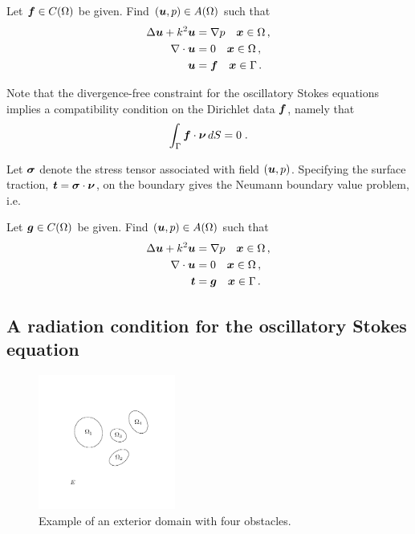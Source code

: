 \begin{definition}
  Let ${\boldsymbol f} \in C(\Omega)$ be given. Find $({\boldsymbol u},p) \in A(\Omega)$
  such that
  \begin{equation}
  \begin{aligned} \label{eq:dir_interior}
    \Delta {\boldsymbol u} + k^{2} {\boldsymbol u} &= \nabla p \quad {\boldsymbol x} \in \Omega \, ,\\
    \nabla \cdot {\boldsymbol u} &= 0 \quad {\boldsymbol x} \in \Omega \, ,  \\
    {\boldsymbol u} &= {\boldsymbol f} \quad {\boldsymbol x} \in \Gamma \, .
  \end{aligned}
  \end{equation}
\end{definition}
Note that the divergence-free constraint for the oscillatory
Stokes equations implies a compatibility condition on the
Dirichlet data ${\boldsymbol f}$, namely that
\begin{equation} \label{eq:dir_compat}
  \int_\Gamma {\boldsymbol f} \cdot {\boldsymbol \nu} \, dS = 0 \; .
\end{equation}


Let ${\boldsymbol \sigma}$ denote the stress tensor associated with
field $({\boldsymbol u},p)$. 
Specifying the surface traction, ${\boldsymbol t} = {\boldsymbol \sigma} \cdot {\boldsymbol \nu}$,
on the boundary gives the Neumann boundary value
problem, i.e.

\begin{definition}
  Let ${\boldsymbol g} \in C(\Omega)$ be given. Find $({\boldsymbol u},p) \in A(\Omega)$
  such that
  \begin{equation}
  \begin{aligned} \label{eq:neu_interior}
    \Delta {\boldsymbol u} + k^{2} {\boldsymbol u} &= \nabla p \quad {\boldsymbol x} \in \Omega \, ,\\
    \nabla \cdot {\boldsymbol u} &= 0 \quad {\boldsymbol x} \in \Omega \, ,  \\
    {\boldsymbol t} &= {\boldsymbol g} \quad {\boldsymbol x} \in \Gamma \, .
  \end{aligned}
  \end{equation}
\end{definition}

\subsection{A radiation condition for the oscillatory Stokes
  equation}

\begin{figure}
  \begin{center}
  \includegraphics[width=0.4\textwidth]{media/ext_dom}
  \caption{Example of an exterior domain with four obstacles.}
  \label{fig:ext_dom}
  \end{center}
\end{figure}

